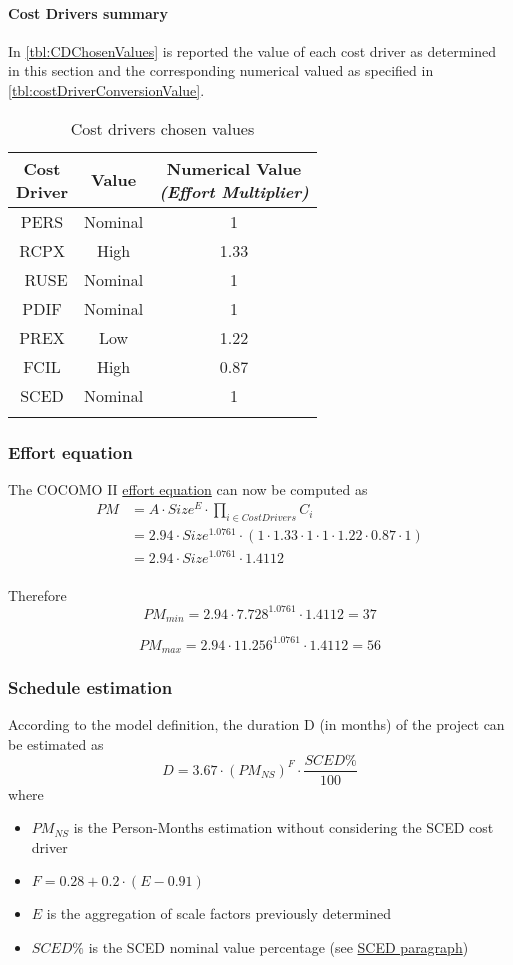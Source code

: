 \paragraph{Cost Drivers summary}
In \autoref{tbl:CDChosenValues} is reported the value of each cost driver as determined in this section and the corresponding numerical valued as specified in \autoref{tbl:costDriverConversionValue}.

\begin{longtable}{ccc}
\specialcell{Cost\\Driver} & Value & \specialcell{Numerical Value\\\emph{(Effort Multiplier)}}\\
\midrule
PERS&Nominal&1\\
RCPX&High&1.33\\\
RUSE&Nominal&1\\
PDIF&Nominal&1\\
PREX&Low&1.22\\
FCIL&High&0.87\\
SCED&Nominal&1\\
\bottomrule
\caption{\label{tbl:CDChosenValues}Cost drivers chosen values}
\end{longtable}


\subsubsection{Effort equation}
The COCOMO II \hyperref[par:cocomoEquation]{effort equation} can now be computed as
\begin{align*}
PM &= A \cdot Size^{E} \cdot \prod_{i \in CostDrivers}C_{i} \\
&= 2.94 \cdot Size^{1.0761} \cdot (1 \cdot 1.33 \cdot 1 \cdot 1 \cdot 1.22 \cdot 0.87 \cdot 1)\\
&= 2.94 \cdot Size^{1.0761} \cdot 1.4112\\
\end{align*}

Therefore
$$PM_{min} = 2.94 \cdot 7.728^{1.0761} \cdot 1.4112 = 37$$

$$PM_{max} = 2.94 \cdot 11.256^{1.0761} \cdot 1.4112 = 56$$
\subsubsection{Schedule estimation} 
According to the model definition, the duration D (in months) of the project can be estimated as
$$D = 3.67 \cdot (PM_{NS})^F \cdot \frac{SCED\%}{100}$$
where
\begin{itemize}
	\item $PM_{NS}$ is the Person-Months estimation without considering the SCED cost driver
	\item $F = 0.28 + 0.2 \cdot (E-0.91)$
	\item $E$ is the aggregation of scale factors previously determined
	\item $SCED\%$ is the SCED nominal value percentage (see \hyperref[par:sced]{SCED paragraph})
\end{itemize}


